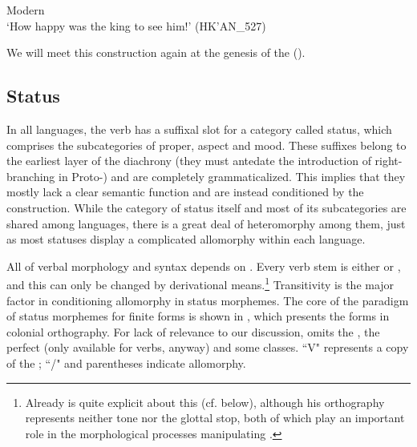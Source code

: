 \documentclass[output=paper]{langsci/langscibook}
\begin{document}
\ea\label{ex:lehmann:12}
Modern  \\
\glt ‘How happy was the king to see him!’ (HK'AN\_527)
\z

We will meet this construction again at the genesis of the  ().


\subsection{Status}\label{sec:lehmann:4.4}\largerpage[2]
In all  languages, the verb has a suffixal slot for a category called status, which comprises the subcategories of  proper, aspect and mood. These suffixes belong to the earliest layer of the diachrony (they must antedate the introduction of right-branching  in Proto-) and are completely grammaticalized. This implies that they mostly lack a clear semantic function and are instead conditioned by the construction. While the category of status itself and most of its subcategories are shared among  languages, there is a great deal of heteromorphy among them, just as most statuses display a complicated allomorphy within each language.

All of verbal morphology and syntax depends on . Every verb stem is either  or , and this can only be changed by derivational means.\footnote{Already \citet[§§107 and 150--158]{Beltrán1746} is quite explicit about this (cf.  below), although his orthography represents neither tone nor the glottal stop, both of which play an important role in the morphological processes manipulating  .} Transitivity is the major factor in conditioning allomorphy in status morphemes. The core of the paradigm of status morphemes for finite forms is shown in , which presents the forms in colonial orthography. For lack of relevance to our discussion,  omits the , the perfect (only available for  verbs, anyway) and some   classes. “V" represents a copy of the ; “/" and parentheses indicate allomorphy.
\end{document}

